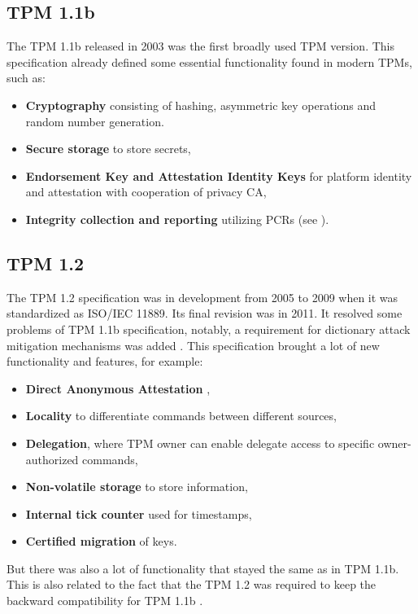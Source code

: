 \subsection{TPM 1.1b}
The TPM 1.1b released in 2003 was the first broadly used TPM version. This specification already defined some essential functionality found in modern TPMs, such as:
\begin{itemize}
    \item \textbf{Cryptography} consisting of hashing, asymmetric key operations and random number generation.
    \item \textbf{Secure storage} to store secrets,
    \item \textbf{Endorsement Key and Attestation Identity Keys} for platform identity and attestation with cooperation of privacy CA,
    \item \textbf{Integrity collection and reporting} utilizing PCRs (see ).
\end{itemize}

\subsection{TPM 1.2}
The TPM 1.2 specification was in development from 2005 to 2009 when it was standardized as ISO/IEC 11889. Its final revision was in 2011. It resolved some problems of TPM 1.1b specification, notably, a requirement for dictionary attack mitigation mechanisms was added \cite[p.~36-37]{tcg_1.2_design_princ}. This specification brought a lot of new functionality and features, for example:
\begin{itemize}
    \item \textbf{Direct Anonymous Attestation} \cite{daaSpec, daaDesignAndImple},
    \item \textbf{Locality} to differentiate commands between different sources,
    \item \textbf{Delegation}, where TPM owner can enable delegate access to specific owner-authorized commands,
    \item \textbf{Non-volatile storage} to store information,
    \item \textbf{Internal tick counter} used for timestamps,
    \item \textbf{Certified migration} of keys.
\end{itemize}
But there was also a lot of functionality that stayed the same as in TPM 1.1b. This is also related to the fact that the TPM 1.2 was required to keep the backward compatibility for TPM 1.1b \cite[p.~169]{tcg_1.2_design_princ}.

